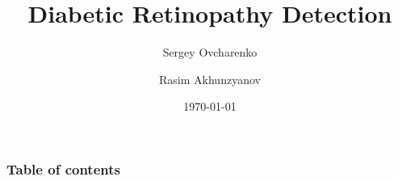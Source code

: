\documentclass{beamer}
\begin{document}
\title{Diabetic Retinopathy Detection}
\subtitle{}  
\author[]{Sergey Ovcharenko  \and Rasim Akhunzyanov }

\date{\today} 

\begin{frame}
\titlepage
\end{frame}

\begin{frame}
\frametitle{Table of contents}\tableofcontents
\end{frame} 






%
%
%
\end{document}
